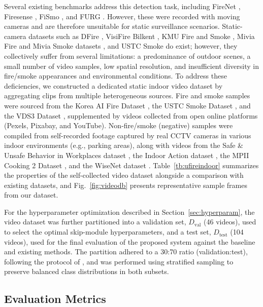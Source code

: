 \documentclass[final,3p,times,twocolumn]{elsarticle}
\begin{document}
Several existing benchmarks address this detection task, including
FireNet \cite{jadon2019firenet}, Firesense \cite{Firesens4:online},
FiSmo \cite{cazzolato2017fismo}, and FURG
\cite{steffens2015unconstrained}. However, these were recorded with
moving cameras and are therefore unsuitable for static surveillance
scenarios. Static-camera datasets such as DFire \cite{dfiredataset},
VisiFire Bilkent \cite{VisiFireBilkent:online}, KMU Fire and Smoke
\cite{KMUFireSmokeDataset}, Mivia Fire and Mivia Smoke datasets
\cite{foggia2015real}, and USTC Smoke \cite{lin2017smoke} do exist;
however, they collectively suffer from several limitations: a
predominance of outdoor scenes, a small number of video samples, low
spatial resolution, and insufficient diversity in fire/smoke appearances
and environmental conditions. To address these deficiencies, we
constructed a dedicated static indoor video dataset by aggregating clips
from multiple heterogeneous sources. Fire and smoke samples were sourced
from the Korea AI Fire Dataset \cite{AIHub87:online}, the USTC Smoke
Dataset \cite{lin2017smoke}, and the VDS3 Dataset \cite{huang2022fire},
supplemented by videos collected from open online platforms (Pexels,
Pixabay, and YouTube). Non-fire/smoke (negative) samples were compiled
from self-recorded footage captured by real CCTV cameras in various
indoor environments (e.g., parking areas), along with videos from the
Safe \& Unsafe Behavior in Workplaces dataset \cite{onal2024video}, the
Indoor Action dataset \cite{deniz2024optimized}, the MPII Cooking 2
Dataset \cite{rohrbach2016recognizing}, and the WiseNet dataset
\cite{marroquin2019wisenet}. Table~\ref{tb:ufireindoor} summarizes the
properties of the self-collected video dataset alongside a comparison
with existing datasets, and Fig.~\ref{fig:videodb} presents
representative sample frames from our dataset.

For the hyperparameter optimization described in
Section~\ref{sec:hyperparam}, the video dataset was further partitioned
into a validation set, $D_{\text{val}}$ (46 videos), used to select the
optimal skip-module hyperparameters, and a test set, $D_{\text{test}}$
(104 videos), used for the final evaluation of the proposed system
against the baseline and existing methods. The partition adhered to a
30:70 ratio (validation:test), following the protocol of
\cite{de2023hybrid}, and was performed using stratified sampling to
preserve balanced class distributions in both subsets.

\subsection{Evaluation Metrics}\label{sec:metrics}
\end{document}
